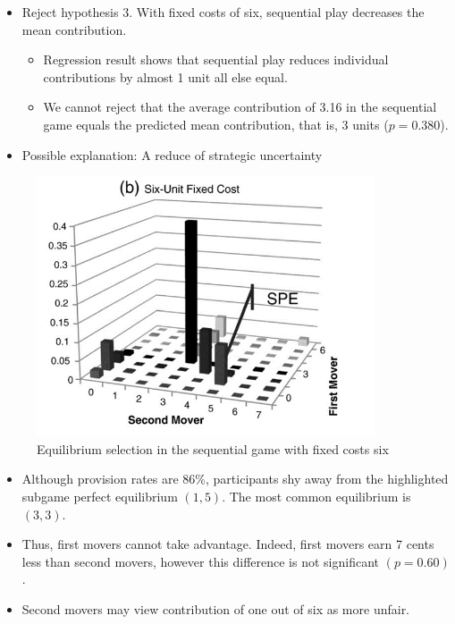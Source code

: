 \documentclass[../root]{subfiles}
\begin{document}
    \begin{itemize}
        \item Reject hypothesis 3. With fixed costs of six, sequential play decreases the mean contribution.
        \begin{itemize}
            \item Regression result shows that sequential play reduces individual contributions by almost 1 unit all else equal.
            \item We cannot reject that the average contribution of 3.16 in the sequential game equals the predicted mean contribution, that is, 3 units ($p = 0.380$).
        \end{itemize}
        \item Possible explanation: A reduce of strategic uncertainty
    \end{itemize}

    \begin{figure}[H]
        \centering
        \includegraphics[width = 10cm]{0605kato/eqm_FC6.png}
        \caption{Equilibrium selection in the sequential game with fixed costs six}
        \label{eqm fc6}
    \end{figure}

    \begin{itemize}
        \item Although provision rates are 86\%, participants shy away from the highlighted subgame perfect equilibrium $(1,5)$. The most common equilibrium is $(3,3)$.
        \item Thus, first movers cannot take advantage. Indeed, first movers earn 7 cents less than second movers, however this difference is not significant $(p = 0.60)$.
        \item Second movers may view contribution of one out of six as more unfair.
    \end{itemize}
\end{document}
